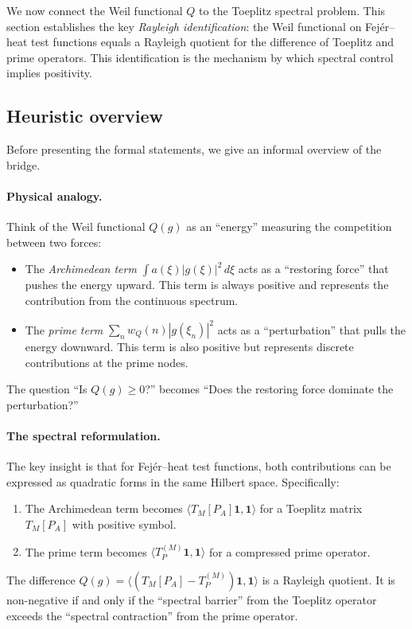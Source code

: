 \documentclass[11pt,a4paper]{article}
\theoremstyle{definition}
\theoremstyle{remark}
\begin{document}
We now connect the Weil functional $Q$ to the Toeplitz spectral problem. This section establishes the key \emph{Rayleigh identification}: the Weil functional on Fej\'er--heat test functions equals a Rayleigh quotient for the difference of Toeplitz and prime operators. This identification is the mechanism by which spectral control implies positivity.

\subsection{Heuristic overview}

Before presenting the formal statements, we give an informal overview of the bridge.

\paragraph{Physical analogy.}
Think of the Weil functional $Q(g)$ as an ``energy'' measuring the competition between two forces:
\begin{itemize}
\item The \emph{Archimedean term} $\int a(\xi) |g(\xi)|^2\, d\xi$ acts as a ``restoring force'' that pushes the energy upward. This term is always positive and represents the contribution from the continuous spectrum.
\item The \emph{prime term} $\sum_n w_Q(n) |g(\xi_n)|^2$ acts as a ``perturbation'' that pulls the energy downward. This term is also positive but represents discrete contributions at the prime nodes.
\end{itemize}
The question ``Is $Q(g) \geq 0$?'' becomes ``Does the restoring force dominate the perturbation?''

\paragraph{The spectral reformulation.}
The key insight is that for Fej\'er--heat test functions, both contributions can be expressed as quadratic forms in the same Hilbert space. Specifically:
\begin{enumerate}
\item The Archimedean term becomes $\langle T_M[P_A] \mathbf{1}, \mathbf{1} \rangle$ for a Toeplitz matrix $T_M[P_A]$ with positive symbol.
\item The prime term becomes $\langle T_P^{(M)} \mathbf{1}, \mathbf{1} \rangle$ for a compressed prime operator.
\end{enumerate}
The difference $Q(g) = \langle (T_M[P_A] - T_P^{(M)}) \mathbf{1}, \mathbf{1} \rangle$ is a Rayleigh quotient. It is non-negative if and only if the ``spectral barrier'' from the Toeplitz operator exceeds the ``spectral contraction'' from the prime operator.
\end{document}
